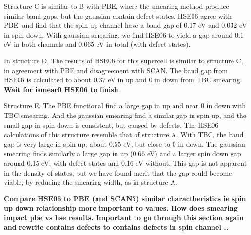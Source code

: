 Structure C is similar to B with PBE, where the smearing method produce similar band gaps, but the gaussian contain defect states. HSE06 agree with PBE, and find that the spin up channel have a band gap of 0.17 eV and 0.032 eV in spin down. With gaussian smearing, we find HSE06 to yield a gap around 0.1 eV in both channels and 0.065 eV in total (with defect states).

In structure D, The results of HSE06 for this supercell is similar to structure C, in agreement with PBE and disagreement with SCAN. The band gap from HSE06 is calculated to about 0.37 eV in up and 0 in down from TBC smearing. \textbf{Wait for ismear0 HSE06 to finish}. 

Structure E. The PBE functional find a large gap in up and near 0 in down with TBC smearing. And the gaussian smearing find a similar gap in spin up, and the small gap in spin down is consistent, but caused by defects. The HSE06 calculations of this structure resemble that of structure A. With TBC, the band gap is very large in spin up, about 0.55 eV, but close to 0 in down. The gaussian smearing finds similarly a large gap in up (0.66 eV) and a larger spin down gap around 0.15 eV, with defect states and 0.16 eV without. This gap is not apparent in the density of states, but we have found merit that the gap could become viable, by reducing the smearing width, as in structure A.  

\textbf{Compare HSE06 to PBE (and SCAN?) similar charactheristics ie spin up down relationship more important to values. How does smearing impact pbe vs hse results. Important to go through this section again and rewrite contains defects to contains defects in spin channel ..}

